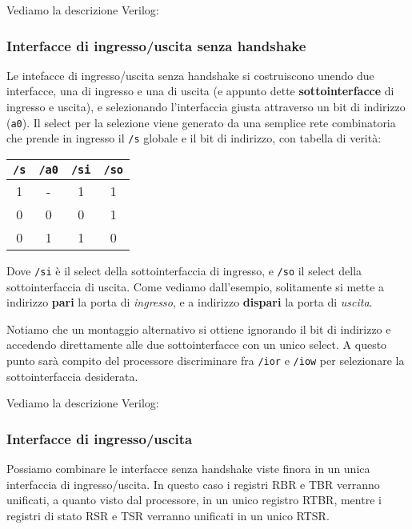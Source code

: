 \documentclass[a4paper,11pt]{article}
\begin{document}
Vediamo la descrizione Verilog:


\subsubsection{Interfacce di ingresso/uscita senza handshake}
Le intefacce di ingresso/uscita senza handshake si costruiscono unendo due interfacce, una di ingresso e una di uscita (e appunto dette \textbf{sottointerfacce} di ingresso e uscita), e selezionando l'interfaccia giusta attraverso un bit di indirizzo (\lstinline|a0|).
Il select per la selezione viene generato da una semplice rete combinatoria che prende in ingresso il \lstinline|/s| globale e il bit di indirizzo, con tabella di verità:
\begin{table}[h!]
	\center 
	\begin{tabular} { c  c | c  c }
		\lstinline|/s| & \lstinline|/a0| & \lstinline|/si| & \lstinline|/so| \\ 
		\hline 
		1 & - & 1 & 1 \\ 
		0 & 0 & 0 & 1 \\ 
		0 & 1 & 1 & 0 
	\end{tabular}
\end{table}
Dove \lstinline|/si| è il select della sottointerfaccia di ingresso, e \lstinline|/so| il select della sottointerfaccia di uscita.
Come vediamo dall'esempio, solitamente si mette a indirizzo \textbf{pari} la porta di \textit{ingresso}, e a indirizzo \textbf{dispari} la porta di \textit{uscita}.

Notiamo che un montaggio alternativo si ottiene ignorando il bit di indirizzo e accedendo direttamente alle due sottointerfacce con un unico select.
A questo punto sarà compito del processore discriminare fra \lstinline|/ior| e \lstinline|/iow| per selezionare la sottointerfaccia desiderata.

Vediamo la descrizione Verilog:


\subsubsection{Interfacce di ingresso/uscita}
Possiamo combinare le interfacce senza handshake viste finora in un unica interfaccia di ingresso/uscita.
In questo caso i registri RBR e TBR verranno unificati, a quanto visto dal processore, in un unico registro RTBR, mentre i registri di stato RSR e TSR verranno unificati in un unico RTSR.
\end{document}
